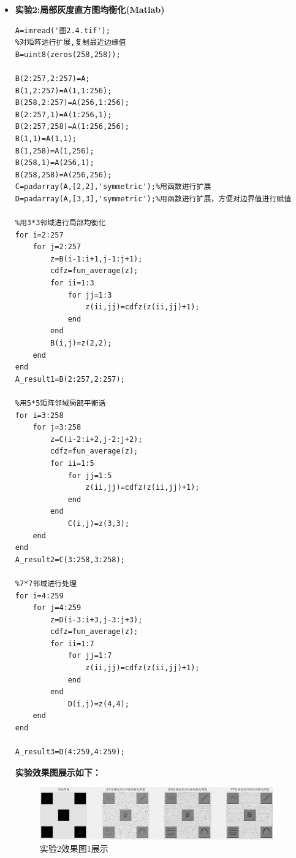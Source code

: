 \documentclass{ctexart}
\begin{document}
\begin{itemize}
\begin{itemize}
\end{itemize} 
\item \textbf{实验2:局部灰度直方图均衡化(Matlab)}
\begin{lstlisting}
A=imread('图2.4.tif');
%对矩阵进行扩展,复制最近边缘值
B=uint8(zeros(258,258));

B(2:257,2:257)=A;
B(1,2:257)=A(1,1:256);
B(258,2:257)=A(256,1:256);
B(2:257,1)=A(1:256,1);
B(2:257,258)=A(1:256,256);
B(1,1)=A(1,1);
B(1,258)=A(1,256);
B(258,1)=A(256,1);
B(258,258)=A(256,256);
C=padarray(A,[2,2],'symmetric');%用函数进行扩展
D=padarray(A,[3,3],'symmetric');%用函数进行扩展，方便对边界值进行赋值

%用3*3邻域进行局部均衡化
for i=2:257
    for j=2:257
        z=B(i-1:i+1,j-1:j+1);
        cdfz=fun_average(z);
        for ii=1:3
            for jj=1:3
                z(ii,jj)=cdfz(z(ii,jj)+1);
            end
        end
        B(i,j)=z(2,2);
    end
end
A_result1=B(2:257,2:257);

%用5*5矩阵邻域局部平衡话
for i=3:258
    for j=3:258
        z=C(i-2:i+2,j-2:j+2);
        cdfz=fun_average(z);
        for ii=1:5
            for jj=1:5
                z(ii,jj)=cdfz(z(ii,jj)+1);
            end
        end
            C(i,j)=z(3,3);
    end
end
A_result2=C(3:258,3:258);

%7*7邻域进行处理
for i=4:259
    for j=4:259
        z=D(i-3:i+3,j-3:j+3);
        cdfz=fun_average(z);
        for ii=1:7
            for jj=1:7
                z(ii,jj)=cdfz(z(ii,jj)+1);
            end
        end
            D(i,j)=z(4,4);
    end
end

A_result3=D(4:259,4:259);
\end{lstlisting}

\textbf{实验效果图展示如下：}
\begin{figure}[htb]
\centering
\includegraphics[width=0.95\textwidth]{2_1.png}
\caption{实验2效果图1展示}
\end{figure}


\end{itemize}
\end{document}
